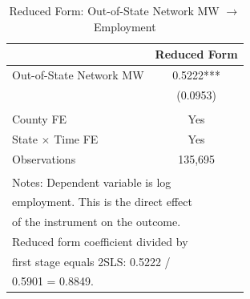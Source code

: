 \begin{table}[!h]
\centering
\caption{\label{tab:reducedform}Reduced Form: Out-of-State Network MW $\rightarrow$ Employment}
\centering
\begin{tabular}[t]{lc}
\toprule
  & Reduced Form\\
\midrule
Out-of-State Network MW & 0.5222***\\
 & (0.0953)\\
 & \\
County FE & Yes\\
State $\times$ Time FE & Yes\\
\addlinespace
Observations & 135,695\\
\bottomrule
\multicolumn{2}{l}{\textsuperscript{} Notes: Dependent variable is log}\\
\multicolumn{2}{l}{employment. This is the direct effect}\\
\multicolumn{2}{l}{of the instrument on the outcome.}\\
\multicolumn{2}{l}{Reduced form coefficient divided by}\\
\multicolumn{2}{l}{first stage equals 2SLS: 0.5222 /}\\
\multicolumn{2}{l}{0.5901 = 0.8849.}\\
\end{tabular}
\end{table}
